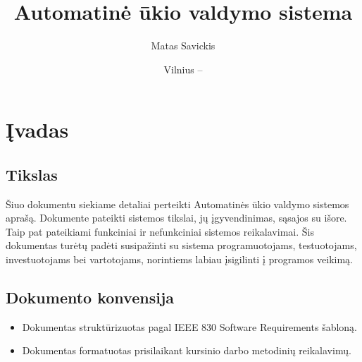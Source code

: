 \documentclass[oneside]{VUMIFPSkursinis}
\title{Automatinė ūkio valdymo sistema}
\author{Matas Savickis}
\date{Vilnius – \the\year}
\begin{document}
\maketitle
\setlength{\parindent}{4em}
 
\tableofcontents

\section{Įvadas}
\subsection{Tikslas}
Šiuo dokumentu siekiame detaliai perteikti Automatinės ūkio valdymo sistemos aprašą. Dokumente pateikti sistemos tikslai, jų įgyvendinimas, sąsajos su išore. Taip pat pateikiami funkciniai ir nefunkciniai sistemos reikalavimai. Šis dokumentas turėtų padėti susipažinti su sistema programuotojams, testuotojams, investuotojams bei vartotojams, norintiems labiau įsigilinti į programos veikimą.
\subsection{Dokumento konvensija}
\begin{itemize}
	\item Dokumentas struktūrizuotas pagal IEEE 830 Software Requirements šabloną.
	\item Dokumentas formatuotas prisilaikant kursinio darbo metodinių reikalavimų.
\end{itemize}
\end{document}
